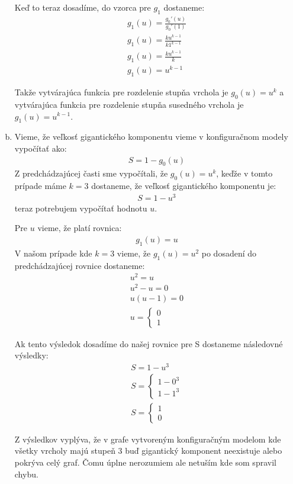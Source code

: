 \documentclass[a4paper]{article}
\begin{document}
\begin{enumerate}[(a)]
	Keď to teraz dosadíme, do vzorca pre $g_1$ dostaneme:
	\begin{gather*}
		g_1(u) = \frac{g_0'(u)}{g_0'(1)} \\
		g_1(u) = \frac{ku^{k-1}}{k1^{k-1}} \\
		g_1(u) = \frac{ku^{k-1}}{k} \\
		g_1(u) = u^{k-1}
	\end{gather*} 

	Takže vytvárajúca funkcia pre rozdelenie stupňa vrchola je $g_0(u) = u^k$ a vytvárajúca funkcia pre rozdelenie stupňa susedného vrchola je $g_1(u) = u^{k-1}$.
	
	\item 
	Vieme, že veľkosť gigantického komponentu vieme v konfiguračnom modely vypočítať ako:
	\begin{gather*}
		S = 1- g_0(u)
	\end{gather*}  
	Z predchádzajúcej časti sme vypočítali, že $g_0(u) = u^k$, keďže v tomto prípade máme $k=3$ dostaneme, že veľkosť gigantického komponentu je: 
	\begin{gather*}
		S = 1- u^3
	\end{gather*}  
	teraz potrebujem vypočítať hodnotu $u$.
	
	Pre $u$ vieme, že platí rovnica:
	\begin{gather*}
		g_1(u) = u
	\end{gather*}
	V našom prípade kde $k=3$ vieme, že $g_1(u) = u^2$ po dosadení do predchádzajúcej rovnice dostaneme:
	\begin{gather*}
		u^2 = u \\
		u^2 - u = 0 \\
		u(u-1) = 0 \\
		u = \begin{cases} 0 \\ 1 \end{cases}
	\end{gather*}
	
	Ak tento výsledok dosadíme do našej rovnice pre S dostaneme následovné výsledky:
	\begin{gather*}
		S = 1 - u^3 \\
		S = \begin{cases} 1- 0^3 \\ 1- 1^3 \end{cases} \\
		S = \begin{cases} 1 \\ 0 \end{cases}
	\end{gather*}

	Z výsledkov vyplýva, že v grafe vytvoreným konfiguračným modelom kde všetky vrcholy majú stupeň 3 buď gigantický komponent neexistuje alebo pokrýva celý graf. Čomu úplne nerozumiem ale netuším kde som spravil chybu.
\end{enumerate}
\end{document}
